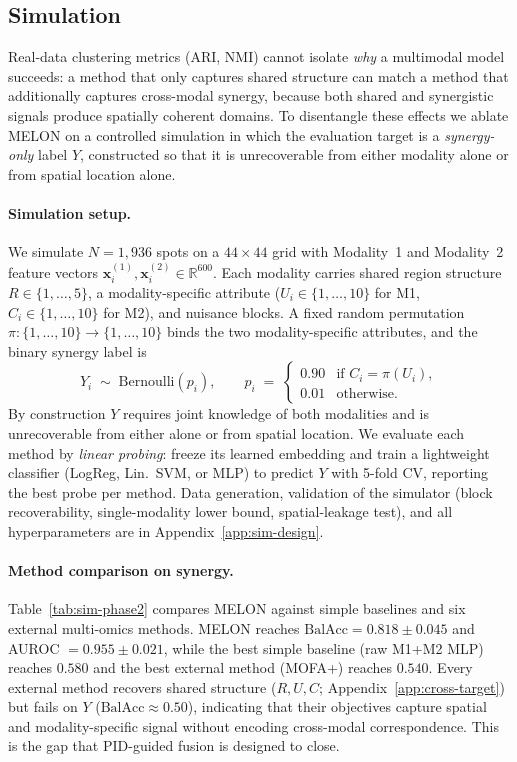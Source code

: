 \documentclass{article}
\theoremstyle{plain}
\theoremstyle{definition}
\begin{document}
\subsection{Simulation}\label{sec:ablation}
Real-data clustering metrics (ARI, NMI) cannot isolate \emph{why} a multimodal model succeeds: a method that only captures shared structure can match a method that additionally captures cross-modal synergy, because both shared and synergistic signals produce spatially coherent domains. To disentangle these effects we ablate MELON on a controlled simulation in which the evaluation target is a \emph{synergy-only} label $Y$, constructed so that it is unrecoverable from either modality alone or from spatial location alone.

\paragraph{Simulation setup.}
We simulate $N{=}1{,}936$ spots on a $44\times44$ grid with Modality~1 and Modality~2 feature vectors $\mathbf{x}^{(1)}_i, \mathbf{x}^{(2)}_i \in \mathbb{R}^{600}$. Each modality carries shared region structure $R\in\{1,\ldots,5\}$, a modality-specific attribute ($U_i\in\{1,\ldots,10\}$ for M1, $C_i\in\{1,\ldots,10\}$ for M2), and nuisance blocks. A fixed random permutation $\pi:\{1,\ldots,10\}\to\{1,\ldots,10\}$ binds the two modality-specific attributes, and the binary synergy label is
\begin{equation}\label{eq:y-def}
    Y_i \;\sim\; \mathrm{Bernoulli}(p_i),
    \qquad
    p_i \;=\;
    \begin{cases}
        0.90 & \text{if } C_i = \pi(U_i),\\
        0.01 & \text{otherwise}.
    \end{cases}
\end{equation}
By construction $Y$ requires joint knowledge of both modalities and is unrecoverable from either alone or from spatial location. We evaluate each method by \emph{linear probing}: freeze its learned embedding and train a lightweight classifier (LogReg, Lin.\ SVM, or MLP) to predict $Y$ with 5-fold CV, reporting the best probe per method. Data generation, validation of the simulator (block recoverability, single-modality lower bound, spatial-leakage test), and all hyperparameters are in Appendix~\ref{app:sim-design}.

\paragraph{Method comparison on synergy.}
Table~\ref{tab:sim-phase2} compares MELON against simple baselines and six external multi-omics methods. MELON reaches $\text{BalAcc}=0.818\pm0.045$ and AUROC $=0.955\pm0.021$, while the best simple baseline (raw M1+M2 MLP) reaches $0.580$ and the best external method (MOFA+) reaches $0.540$. Every external method recovers shared structure ($R,U,C$; Appendix~\ref{app:cross-target}) but fails on $Y$ ($\text{BalAcc}\approx0.50$), indicating that their objectives capture spatial and modality-specific signal without encoding cross-modal correspondence. This is the gap that PID-guided fusion is designed to close.
\end{document}
